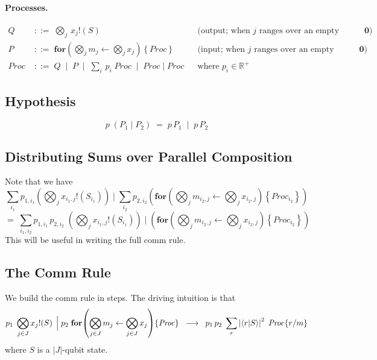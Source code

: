 \documentclass[11pt]{article}
\newcommand{\Proc}{\mathit{Proc}}
\begin{document}
\paragraph{Processes.}
\begin{align*}
  Q &\;::=\; \bigotimes_{j}\, x_j!\!\left(S\right)
  &&\text{(output; when $j$ ranges over an empty domain this is $\mathbf{0}$)}\\[6pt]
  P &\;::=\; \mathbf{for}\!\left(\bigotimes_{j} m_j
             \leftarrow \bigotimes_{j} x_j \right)\!\left\{\Proc\right\}
  &&\text{(input; when $j$ ranges over an empty domain this is $\mathbf{0}$)}\\[6pt]
  \Proc &\;::=\; Q \;\mid\; P
         \;\mid\; \textstyle\sum_{i}\, p_i\;\Proc
         \;\mid\; \Proc \mid \Proc
  &&\text{where } p_i \in \mathbb{R}^{+}
\end{align*}

\subsection{Hypothesis}

\[
  p\;(P_1 \mid P_2) \;=\; p\,P_1 \;\mid\; p\,P_2
\]

\subsection{Distributing Sums over Parallel Composition}

Note that we have
\[
  \sum_{i_1} p_{1,i_1}
    \!\left(\bigotimes_{j} x_{i_1,j}!\!\left(S_{i_1}\right)\right)
  \;\Big|\;
  \sum_{i_2} p_{2,i_2}
    \!\left(
      \mathbf{for}\!\left(
        \bigotimes_{j} m_{i_2,j}
        \leftarrow
        \bigotimes_{j} x_{i_2,j}
      \right)\!\left\{\Proc_{i_2}\right\}
    \right)
\]
\[
  =\;
  \sum_{i_1, i_2} p_{1,i_1}\, p_{2,i_2}\;
    \left(\bigotimes_{j} x_{i_1,j}!\!\left(S_{i_1}\right)\right)
  \;\Big|\;
    \left(
      \mathbf{for}\!\left(
        \bigotimes_{j} m_{i_2,j}
        \leftarrow
        \bigotimes_{j} x_{i_2,j}
      \right)\!\left\{\Proc_{i_2}\right\}
    \right)
\]
This will be useful in writing the full comm rule.

\subsection{The Comm Rule}

We build the comm rule in steps.  The driving intuition is that
\[
  p_1 \;\bigotimes_{j \in J} x_j!\!\left(S\right)
  \;\Big|\;
  p_2 \;\mathbf{for}\!\left(
    \bigotimes_{j \in J} m_j \leftarrow \bigotimes_{j \in J} x_j
  \right)\!\left\{\Proc\right\}
  \;\;\longrightarrow\;\;
  p_1\, p_2 \;\sum_{r} \left|\braket{r | S}\right|^{2}\;
  \Proc\!\left\{r / m\right\}
\]
where $S$ is a $|J|$-qubit state.
\end{document}
